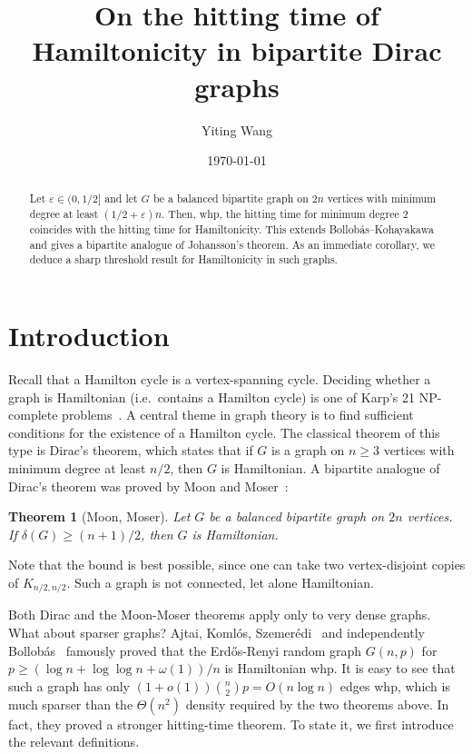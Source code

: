 \documentclass[reqno,final,a4paper]{amsart}
\title{On the hitting time of Hamiltonicity in bipartite Dirac graphs}
\author{Yiting Wang}\address{Institute of Science and Technology Austria,~Klosterneuburg,~3400,~Austria.}\email{yiting.wang@ist.ac.at}
\date{\today}
\numberwithin{equation}{section}
\newtheorem{theorem}{Theorem}[section]
\theoremstyle{definition}
\theoremstyle{remark}
\newcommand{\eps}{\varepsilon}
\begin{document}
\begin{abstract}
Let $\eps\in (0,1/2]$ and let $G$ be a balanced bipartite graph on $2n$ vertices with minimum degree at least $(1/2 + \eps)n$. Then, whp, the hitting time for minimum degree 2 coincides with the hitting time for Hamiltonicity. This extends Bollob\'{a}s--Kohayakawa and gives a bipartite analogue of Johansson's theorem.
As an immediate corollary, we deduce a sharp threshold result for Hamiltonicity in such graphs. 
\end{abstract}
\maketitle

\section{Introduction}
Recall that a Hamilton cycle is a vertex-spanning cycle. 
Deciding whether a graph is Hamiltonian (i.e.\ contains a Hamilton cycle) is one of Karp's 21 NP-complete problems~\cite{Karp}. 
A central theme in graph theory is to find sufficient conditions for the existence of a Hamilton cycle. 
The classical theorem of this type is Dirac's theorem, which states that if $G$ is a graph on $n\geq 3$ vertices with minimum degree at least $n/2$, then $G$ is Hamiltonian.
A bipartite analogue of Dirac's theorem was proved by Moon and Moser~\cite{Moon-Moser}:
\begin{theorem}[Moon, Moser]\label{thm:Moon-Moser}
    Let $G$ be a balanced bipartite graph on $2n$ vertices. If $\delta(G) \geq (n+1)/2$, then $G$ is Hamiltonian.
\end{theorem}
Note that the bound is best possible, since one can take two vertex-disjoint copies of $K_{n/2,n/2}$. Such a graph is not connected, let alone Hamiltonian.

Both Dirac and the Moon-Moser theorems apply only to very dense graphs. 
What about sparser graphs? Ajtai, Koml\'os, Szemer\'edi~\cite{Ajtai-Komlos-Szemeredi} and independently Bollob\'{a}s~\cite{Bollobas} famously proved that the Erd\H{o}s-Renyi random graph $G(n,p)$ for $p\geq (\log n+ \log \log n+ \omega(1))/n$ is Hamiltonian whp. 
It is easy to see that such a graph has only $(1+o(1))\binom{n}{2}p = O(n\log n)$ edges whp, which is much sparser than the $\Theta(n^2)$ density required by the two theorems above.
In fact, they proved a stronger hitting-time theorem. To state it, we first introduce the relevant definitions.
\end{document}
